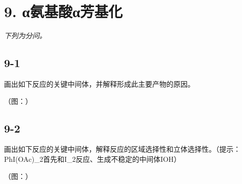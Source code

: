 \section*{9. α氨基酸α芳基化}
\textit{下列为分问。}

\subsection*{9-1}
画出如下反应的关键中间体，并解释形成此主要产物的原因。

（图：）

\subsection*{9-2}
画出如下反应的关键中间体，解释反应的区域选择性和⽴体选择性。（提⽰：PhI(OAc)_{2}⾸先和I_{2}反应、⽣成不稳定的中间体IOH）

（图：）
